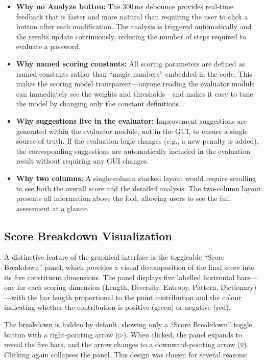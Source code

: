 \begin{itemize}
    \item \textbf{Why no Analyze button:} The 300\,ms debounce provides real-time feedback that is faster and more natural than requiring the user to click a button after each modification. The analysis is triggered automatically and the results update continuously, reducing the number of steps required to evaluate a password.

    \item \textbf{Why named scoring constants:} All scoring parameters are defined as named constants rather than ``magic numbers'' embedded in the code. This makes the scoring model transparent---anyone reading the evaluator module can immediately see the weights and thresholds---and makes it easy to tune the model by changing only the constant definitions.

    \item \textbf{Why suggestions live in the evaluator:} Improvement suggestions are generated within the evaluator module, not in the GUI, to ensure a single source of truth. If the evaluation logic changes (e.g., a new penalty is added), the corresponding suggestions are automatically included in the evaluation result without requiring any GUI changes.

    \item \textbf{Why two columns:} A single-column stacked layout would require scrolling to see both the overall score and the detailed analysis. The two-column layout presents all information above the fold, allowing users to see the full assessment at a glance.
\end{itemize}

\subsection{Score Breakdown Visualization}

A distinctive feature of the graphical interface is the toggleable ``Score Breakdown'' panel, which provides a visual decomposition of the final score into its five constituent dimensions. The panel displays five labelled horizontal bars---one for each scoring dimension (Length, Diversity, Entropy, Pattern, Dictionary)---with the bar length proportional to the point contribution and the colour indicating whether the contribution is positive (green) or negative (red).

The breakdown is hidden by default, showing only a ``Score Breakdown'' toggle button with a right-pointing arrow (\texttt{$\triangleright$}). When clicked, the panel expands to reveal the five bars, and the arrow changes to a downward-pointing arrow (\texttt{$\triangledown$}). Clicking again collapses the panel. This design was chosen for several reasons:

